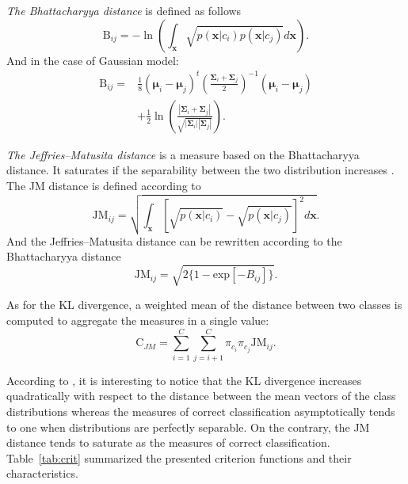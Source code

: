 \documentclass[journal,peerreview,onecolumn]{IEEEtran}
\begin{document}
            \emph{The Bhattacharyya distance} is defined as follows
            \begin{equation}
                \text{B}_{ij} = - \ln \left( \int_\mathbf{x} \sqrt{p(\mathbf{x}|c_i) p(\mathbf{x}|c_j)} d\mathbf{x} \right).
            \end{equation}
            And in the case of Gaussian model:
            \begin{align}
                \text{B}_{ij} = &\frac{1}{8} (\boldsymbol{\mu}_i - \boldsymbol{\mu}_j)^t \left( \frac{\boldsymbol{\Sigma}_i + \boldsymbol{\Sigma}_j}{2} \right)^{-1} (\boldsymbol{\mu}_i - \boldsymbol{\mu}_j) \nonumber \\
                &+ \frac{1}{2} \ln \left( \frac{|\boldsymbol{\Sigma}_i + \boldsymbol{\Sigma}_j|}{\sqrt{|\boldsymbol{\Sigma}_i| |\boldsymbol{\Sigma}_j|}} \right).
            \end{align}

            \emph{The Jeffries–Matusita distance} is a measure based on the Bhattacharyya distance. It saturates if the separability between the two distribution increases \cite{bruzzone2009novel}. The JM distance is defined according to
            \begin{equation}
                \text{JM}_{ij} = \sqrt{ \int_\mathbf{x} \left[\sqrt{p(\mathbf{x}|c_i)} - \sqrt{p(\mathbf{x}|c_j)}\right]^2 d\mathbf{x} }.
            \end{equation}
            And the Jeffries–Matusita distance can be rewritten according to the Bhattacharyya distance
            \begin{equation}
                \text{JM}_{ij} = \sqrt{ 2 \{1 - \text{exp}[-B_{ij}]\} }.
            \end{equation}

            As for the KL divergence, a weighted mean of the distance between two classes is computed to aggregate the measures in a single value:
            \begin{equation}
                \text{C}_{JM} = \sum_{i=1}^{C} \sum_{j=i + 1}^{C} \pi_{c_i} \pi_{c_j} \text{JM}_{ij}.
            \end{equation}

            \vspace{10 mm}

            According to \cite{bruzzone2009novel}, it is interesting to notice that the KL divergence increases quadratically with respect to the distance between the mean vectors of the class distributions whereas the measures of correct classification asymptotically tends to one when distributions are perfectly separable. On the contrary, the JM distance tends to saturate as the measures of correct classification. Table~\ref{tab:crit} summarized the presented criterion functions and their characteristics.
\end{document}
